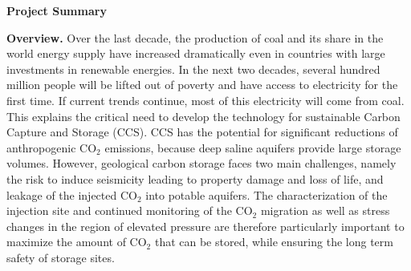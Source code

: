 \documentclass[11pt,final]{article}
\def\CO2{CO$_2$}
\begin{document}
\pagestyle{empty}





\begin{center}
{\bf Project Summary}
\end{center}


{\bf Overview.}  Over the last decade, the production of coal and its
share in the world energy supply have increased dramatically even in
countries with large investments in renewable energies.  In the next
two decades, several hundred million people will be lifted out of
poverty and have access to electricity for the first time. If current
trends continue, most of this electricity will come from coal.  This
explains the critical need to develop the technology for sustainable Carbon
Capture and Storage (CCS). CCS has the potential for significant
reductions of anthropogenic \CO2 emissions, because deep saline
aquifers provide large storage volumes. However, geological carbon
storage faces two main challenges, namely the risk to induce
seismicity leading to property damage and loss of life, and leakage of
the injected \CO2 into potable aquifers.  The characterization of the
injection site and continued monitoring of the \CO2 migration as well
as stress changes in the region of elevated pressure are therefore
particularly important to maximize the amount of \CO2 that can be
stored, while ensuring the long term safety of storage sites.
\end{document}
